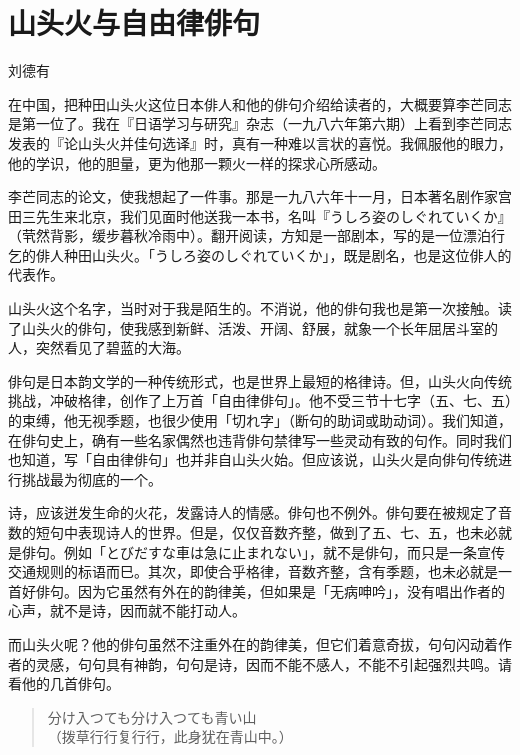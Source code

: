 \chapter{\FK 山头火与自由律俳句}
{\FS

    \hfill 刘德有

    \bigskip

    在中国，把种田山头火这位日本俳人和他的俳句介绍给读者的，大概要算李芒同志是第一位了。我在『日语学习与研究』杂志（一九八六年第六期）上看到李芒同志发表的『论山头火并佳句选译』时，真有一种难以言状的喜悦。我佩服他的眼力，他的学识，他的胆量，更为他那一颗火一样的探求心所感动。

    李芒同志的论文，使我想起了一件事。那是一九八六年十一月，日本著名剧作家宫田三先生来北京，我们见面时他送我一本书，名叫『{\FM うしろ姿のしぐれていくか}』（茕然背影，缓步暮秋冷雨中\footnotemark[1]）。翻开阅读，方知是一部剧本，写的是一位漂泊行乞的俳人种田山头火。「{\FM うしろ姿のしぐれていくか}」，既是剧名，也是这位俳人的代表作。


    山头火这个名字，当时对于我是陌生的。不消说，他的俳句我也是第一次接触。读了山头火的俳句，使我感到新鲜、活泼、开阔、舒展，就象一个长年屈居斗室的人，突然看见了碧蓝的大海。

    俳句是日本韵文学的一种传统形式，也是世界上最短的格律诗。但，山头火向传统挑战，冲破格律，创作了上万首「自由律俳句」。他不受三节十七字（五、七、五）的束缚，他无视季题，也很少使用「切れ字」（断句的助词或助动词）。我们知道，在俳句史上，确有一些名家偶然也违背俳句禁律写一些灵动有致的句作。同时我们也知道，写「自由律俳句」也并非自山头火始。但应该说，山头火是向俳句传统进行挑战最为彻底的一个。

    诗，应该迸发生命的火花，发露诗人的情感。俳句也不例外。俳句要在被规定了音数的短句中表现诗人的世界。但是，仅仅音数齐整，做到了五、七、五，也未必就是俳句。例如「{\FM とびだすな車は急に止まれない}」，就不是俳句，而只是一条宣传交通规则的标语而巳。其次，即使合乎格律，音数齐整，含有季题，也未必就是一首好俳句。因为它虽然有外在的韵律美，但如果是「无病呻吟」，没有唱出作者的心声，就不是诗，因而就不能打动人。

    而山头火呢？他的俳句虽然不注重外在的韵律美，但它们着意奇拔，句句闪动着作者的灵感，句句具有神韵，句句是诗，因而不能不感人，不能不引起强烈共鸣。请看他的几首俳句。
    \begin{quote}
        {\FM 分け入つても分け入つても青い山}\\
        （拨草行行复行行，此身犹在青山中。）


\end{quote}}
